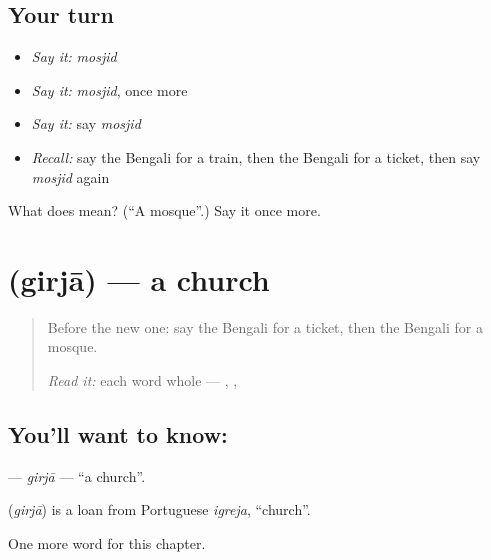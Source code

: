 \subsection*{Your turn}
\begin{itemize}
\raggedright
  \item \emph{Say it:} \emph{mosjid}
  \item \emph{Say it:} \emph{mosjid}, once more
  \item \emph{Say it:} say \emph{mosjid}
  \item \emph{Recall:} say the Bengali for a train, then the Bengali for a ticket, then say \emph{mosjid} again
\end{itemize}

\begin{tcolorbox}[breakable,colback=teal!4,colframe=teal!35!black,title={Before you move on}]
What does  mean? (\textquotedblleft{}A mosque\textquotedblright{}.) Say it once more.
\end{tcolorbox}
\section[\texorpdfstring{\bn{গির্জা} (girjā)}{গির্জা (girjā)}]{ (girjā) — a church}

\label{lesson:BN-C129-girja}



\begin{quote}
Before the new one: say the Bengali for a ticket, then the Bengali for a mosque.

\emph{Read it:} each word whole — \textbf{}, \textbf{}, \textbf{}
\end{quote}

\subsection*{You'll want to know: }
\textbf{} — \emph{girjā} — \textquotedblleft{}a church\textquotedblright{}.

\begin{cousinweb}
\textbf{} (\emph{girjā}) is a loan from Portuguese \emph{igreja}, \textquotedblleft{}church\textquotedblright{}.
\end{cousinweb}

\begin{grammarlens}[title={What you've built}]
One more word for this chapter.
\end{grammarlens}

